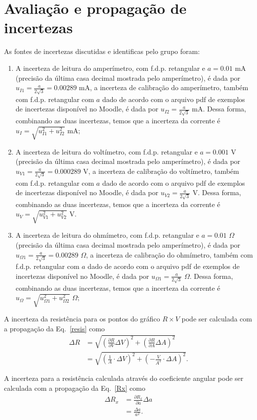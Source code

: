\section{Avaliação e propagação de incertezas}

As fontes de incertezas discutidas e identificas pelo grupo foram:
\begin{enumerate}
    \item A incerteza de leitura do amperímetro, com f.d.p. retangular e $a=0.01$ mA (precisão da última casa decimal mostrada pelo amperímetro), é dada por $u_{I1}=\frac{a}{2\sqrt{3}}=0.00289$ mA, a incerteza de calibração do amperímetro, também com f.d.p. retangular com $a$ dado de acordo com o arquivo pdf de exemplos de incertezas disponível no Moodle, é dada por $u_{I2}=\frac{a}{2\sqrt{3}}$ mA. Dessa forma, combinando as duas incertezas, temos que a incerteza da corrente é $u_I=\sqrt{u_{I1}^2+u_{I2}^2}$ mA;
    \item A incerteza de leitura do voltímetro, com f.d.p. retangular e $a=0.001$ V (precisão da última casa decimal mostrada pelo amperímetro), é dada por $u_{V1}=\frac{a}{2\sqrt{3}}=0.000289$ V, a incerteza de calibração do voltímetro, também com f.d.p. retangular com $a$ dado de acordo com o arquivo pdf de exemplos de incertezas disponível no Moodle, é dada por $u_{V2}=\frac{a}{2\sqrt{3}}$ V. Dessa forma, combinando as duas incertezas, temos que a incerteza da corrente é $u_V=\sqrt{u_{V1}^2+u_{V2}^2}$ V.
    \item A incerteza de leitura do ohmímetro, com f.d.p. retangular e $a=0.01$ $\Omega$ (precisão da última casa decimal mostrada pelo amperímetro), é dada por $u_{\Omega 1}=\frac{a}{2\sqrt{3}}=0.00289$ $\Omega$, a incerteza de calibração do ohmímetro, também com f.d.p. retangular com $a$ dado de acordo com o arquivo pdf de exemplos de incertezas disponível no Moodle, é dada por $u_{\Omega 1}=\frac{a}{2\sqrt{3}}$ $\Omega$. Dessa forma, combinando as duas incertezas, temos que a incerteza da corrente é $u_\Omega=\sqrt{u_{\Omega 1}^2+u_{\Omega 2}^2}$ $\Omega$;
\end{enumerate}

A incerteza da resistência para os pontos do gráfico $R\times V$ pode ser calculada com a propagação da Eq.~\ref{resis} como
\begin{align*}
\Delta R &=\sqrt{\left(\frac{\partial R}{\partial V} \Delta V\right)^{2}+\left(\frac{\partial R}{\partial A} \Delta A\right)^{2}} \\
&=\sqrt{(\frac{1}{A} \cdot \Delta V)^{2}+\left(-\frac{V}{A^2} \cdot \Delta A\right)^{2}}.  
\end{align*}

A incerteza para a resistência calculada através do coeficiente angular pode ser calculada com a propagação da Eq.~\ref{Rx} como
\begin{align*}
\Delta R_x &=\frac{\partial R_x}{\partial a} \Delta a \\
&=\frac{\Delta a}{a^2}.  
\end{align*}